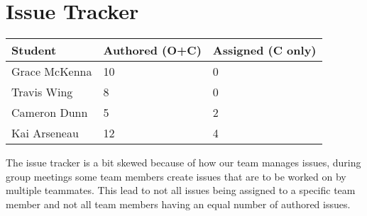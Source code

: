 \documentclass{article}
\begin{document}
\section{Issue Tracker}

\begin{table}[H]
\centering
\begin{tabular}{lll}
\toprule
\textbf{Student} & \textbf{Authored (O+C)} & \textbf{Assigned (C only)}\\
\midrule
Grace McKenna & 10 & 0 \\
Travis Wing & 8 & 0 \\
Cameron Dunn & 5 & 2 \\
Kai Arseneau & 12 & 4 \\
\bottomrule
\end{tabular}
\end{table}

The issue tracker is a bit skewed because of how our team manages issues, during group meetings some team members create issues that are to be worked on by multiple teammates.
This lead to not all issues being assigned to a specific team member and not all team members having an equal number of authored issues.
\end{document}
